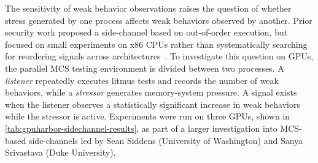 \begin{table}
\centering
\footnotesize
\caption{Results of the MCS-based side-channel testing campaign on GPUs. Signal columns report the percentage of trials with any signal and with a reliable signal. Increase columns report the average and maximum percentage increase in weak behavior observations under stress.}
\label{tab:gpuharbor-sidechannel-results}
\end{table}

The sensitivity of weak behavior observations raises the question of whether stress generated by one process affects weak behaviors observed by another. Prior security work proposed a side-channel based on out-of-order execution, but focused on small experiments on x86 CPUs rather than systematically searching for reordering signals across architectures~\cite{antoine2017sidechannel}. To investigate this question on GPUs, the parallel MCS testing environment is divided between two processes. A \textit{listener} repeatedly executes litmus tests and records the number of weak behaviors, while a \textit{stressor} generates memory-system pressure. A signal exists when the listener observes a statistically significant increase in weak behaviors while the stressor is active. Experiments were run on three GPUs, shown in \mytab\ref{tab:gpuharbor-sidechannel-results}, as part of a larger investigation into MCS-based side-channels led by Sean Siddens (University of Washington) and Sanya Srivastava (Duke University).

